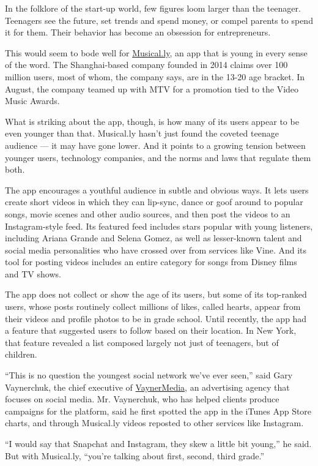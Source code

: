 In the folklore of the start-up world, few figures loom larger than the
teenager. Teenagers see the future, set trends and spend money, or
compel parents to spend it for them. Their behavior has become an
obsession for entrepreneurs.

This would seem to bode well for
\href{http://www.musical.ly/}{Musical.ly}, an app that is young in every
sense of the word. The Shanghai-based company founded in 2014 claims
over 100 million users, most of whom, the company says, are in the 13-20
age bracket. In August, the company teamed up with MTV for a promotion
tied to the Video Music Awards.

What is striking about the app, though, is how many of its users appear
to be even younger than that. Musical.ly hasn't just found the coveted
teenage audience --- it may have gone lower. And it points to a growing
tension between younger users, technology companies, and the norms and
laws that regulate them both.

The app encourages a youthful audience in subtle and obvious ways. It
lets users create short videos in which they can lip-sync, dance or goof
around to popular songs, movie scenes and other audio sources, and then
post the videos to an Instagram-style feed. Its featured feed includes
stars popular with young listeners, including Ariana Grande and Selena
Gomez, as well as lesser-known talent and social media personalities who
have crossed over from services like Vine. And its tool for posting
videos includes an entire category for songs from Disney films and TV
shows.

The app does not collect or show the age of its users, but some of its
top-ranked users, whose posts routinely collect millions of likes,
called hearts, appear from their videos and profile photos to be in
grade school. Until recently, the app had a feature that suggested users
to follow based on their location. In New York, that feature revealed a
list composed largely not just of teenagers, but of children.

``This is no question the youngest social network we've ever seen,''
said Gary Vaynerchuk, the chief executive of
\href{http://www.vaynermedia.com/}{VaynerMedia}, an advertising agency
that focuses on social media. Mr. Vaynerchuk, who has helped clients
produce campaigns for the platform, said he first spotted the app in the
iTunes App Store charts, and through Musical.ly videos reposted to other
services like Instagram.

``I would say that Snapchat and Instagram, they skew a little bit
young,'' he said. But with Musical.ly, ``you're talking about first,
second, third grade.''

